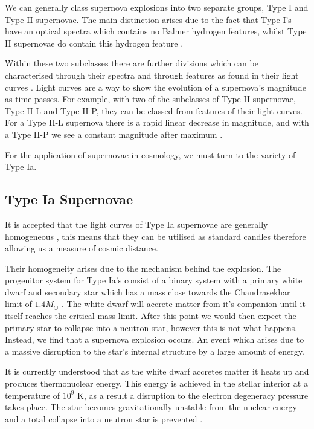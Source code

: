 \documentclass[twocolumn]{revtex4}
\begin{document}
We can generally class supernova explosions into two separate groups, Type I and Type II supernovae. The main distinction arises due to the fact that Type I's have an optical spectra which contains no Balmer hydrogen features, whilst Type II supernovae do contain this hydrogen feature \cite{mod_ast}. 

Within these two subclasses there are further divisions which can be characterised through their spectra and through features as found in their light curves \cite{obs_phys_class_sn}. Light curves are a way to show the evolution of a supernova's magnitude as time passes. For example, with two of the subclasses of Type II supernovae, Type II-L and Type II-P, they can be classed from features of their light curves. For a Type II-L supernova there is a rapid linear decrease in magnitude, and with a Type II-P we see a constant magnitude after maximum \cite{mod_ast}.

For the application of supernovae in cosmology, we must turn to the variety of Type Ia.

\vspace{-3ex}
\subsection{Type Ia Supernovae}
\vspace{-2ex}
It is accepted that the light curves of Type Ia supernovae are generally homogeneous \cite{posn}, this means that they can be utilised as standard candles therefore allowing us a measure of cosmic distance. 

Their homogeneity arises due to the mechanism behind the explosion. The progenitor system for Type Ia's consist of a binary system with a primary white dwarf and secondary star which has a mass close towards the Chandrasekhar limit of $1.4 M_{\odot}$ \cite{mod_ast, posn}. The white dwarf will accrete matter from it's companion until it itself reaches the critical mass limit. After this point we would then expect the primary star to collapse into a neutron star, however this is not what happens. Instead, we find that a supernova explosion occurs. An event which arises due to a massive disruption to the star's internal structure by a large amount of energy.

It is currently understood that as the white dwarf accretes matter it heats up and produces thermonuclear energy. This energy is achieved in the stellar interior at a temperature of $10^9$ K, as a result a disruption to the electron degeneracy pressure takes place. The star becomes gravitationally unstable from the nuclear energy and a total collapse into a neutron star is prevented \cite{longair, posn}.
\end{document}
